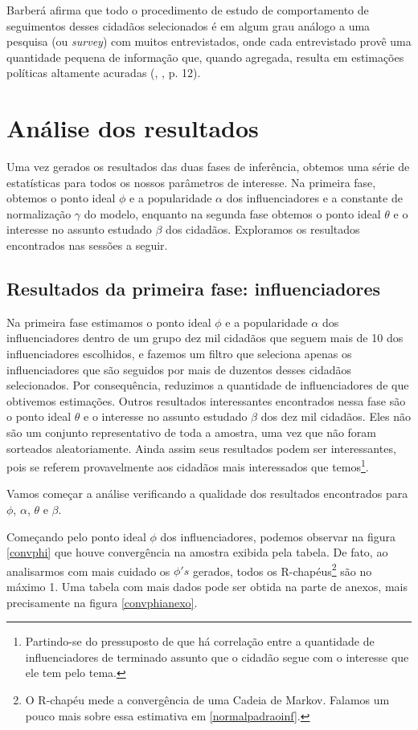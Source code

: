 \documentclass[
	12pt,				%
	openright,			%
	twoside,			%
	a4paper,			%
	english,			%
	brazil				%
	]{abntex2}
\begin{document}
 Barberá afirma que todo o procedimento de estudo de comportamento de seguimentos desses cidadãos selecionados é em algum grau análogo a uma pesquisa (ou \emph{survey}) com muitos entrevistados, onde cada entrevistado provê uma quantidade pequena de informação que, quando agregada, resulta em estimações políticas altamente acuradas (, \citeyear{barbera2015}, p. 12).
 
 
 \chapter{Análise dos resultados}
 Uma vez gerados os resultados das duas fases de inferência, obtemos uma série de estatísticas para todos os nossos parâmetros de interesse. Na primeira fase, obtemos o ponto ideal $\phi$ e a popularidade $\alpha$ dos influenciadores e a constante de normalização $\gamma$ do modelo, enquanto na segunda fase obtemos o ponto ideal $\theta$ e o interesse no assunto estudado $\beta$ dos cidadãos. Exploramos os resultados encontrados nas sessões a seguir.
 
 \section{Resultados da primeira fase: influenciadores}
 Na primeira fase estimamos o ponto ideal $\phi$ e a popularidade $\alpha$ dos influenciadores dentro de um grupo dez mil cidadãos que seguem mais de 10 dos influenciadores escolhidos, e fazemos um filtro que seleciona apenas os influenciadores que são seguidos por mais de duzentos desses cidadãos selecionados. Por consequência, reduzimos a quantidade de influenciadores de que obtivemos estimações. Outros resultados interessantes encontrados nessa fase são o ponto ideal $\theta$ e o interesse no assunto estudado $\beta$ dos dez mil cidadãos. Eles não são um conjunto representativo de toda a amostra, uma vez que não foram sorteados aleatoriamente. Ainda assim seus resultados podem ser interessantes, pois se referem provavelmente aos cidadãos mais interessados que temos\footnote{Partindo-se do pressuposto de que há correlação entre a quantidade de influenciadores de terminado assunto que o cidadão segue com o interesse que ele tem pelo tema.}.
 
 Vamos começar a análise verificando a qualidade dos resultados encontrados para $\phi$, $\alpha$, $\theta$ e $\beta$.
 
 Começando pelo ponto ideal $\phi$ dos influenciadores, podemos observar na figura \ref{convphi} que houve convergência na amostra exibida pela tabela. De fato, ao analisarmos com mais cuidado os $\phi's$ gerados, todos os R-chapéus\footnote{O R-chapéu mede a convergência de uma Cadeia de Markov. Falamos um pouco mais sobre essa estimativa em \ref{normalpadraoinf}.} são no máximo 1. Uma tabela com mais dados pode ser obtida na parte de anexos, mais precisamente na figura \ref{convphianexo}.
\end{document}

